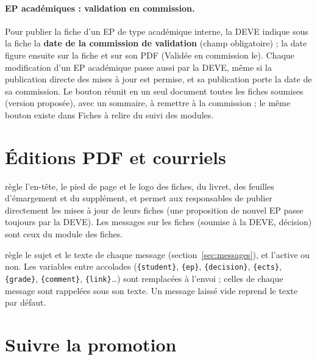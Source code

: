 \documentclass[11pt,a4paper]{article}
\begin{document}


\paragraph{EP académiques : validation en commission.} Pour publier la fiche d'un EP de type
\og académique interne\fg{}, la DEVE indique sous la fiche la \textbf{date de la commission de
validation} (champ obligatoire) ; la date figure ensuite sur la fiche et sur son PDF
(\og Validée en commission le\fg{}). Chaque modification d'un EP académique passe aussi par la
DEVE, même si la publication directe des mises à jour est permise, et sa publication porte la
date de sa commission. Le bouton  réunit en un seul document
toutes les fiches soumises (version proposée), avec un sommaire, à remettre à la commission ;
le même bouton existe dans \og Fiches à relire\fg{} du suivi des modules.

\section{Éditions PDF et courriels}\label{sec:courriels}

 règle l'en-tête, le pied de page et le logo des fiches,
du livret, des feuilles d'émargement et du supplément, et permet aux responsables de publier
directement les mises à jour de leurs fiches (une proposition de nouvel EP passe toujours par
la DEVE). Les messages sur les fiches (soumise à la DEVE, décision) sont ceux du module des
fiches.

 règle le sujet et le texte de chaque message (section~\ref{sec:messages}),
et l'active ou non. Les variables entre accolades (\texttt{\{student\}}, \texttt{\{ep\}},
\texttt{\{decision\}}, \texttt{\{ects\}}, \texttt{\{grade\}}, \texttt{\{comment\}},
\texttt{\{link\}}\dots{}) sont remplacées à l'envoi ; celles de chaque message sont rappelées
sous son texte. Un message laissé vide reprend le texte par défaut.


\section{Suivre la promotion}\label{sec:suivi}
\end{document}
